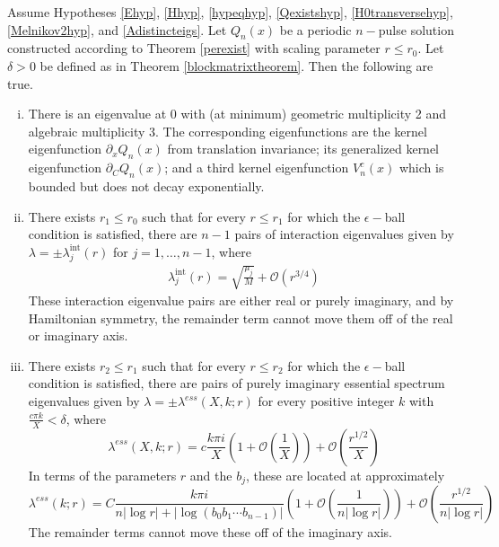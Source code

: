 \documentclass[thesis.tex]{subfiles}
\begin{document}
\begin{theorem}\label{locateeigtheorem}
Assume Hypotheses \ref{Ehyp}, \ref{Hhyp}, \ref{hypeqhyp}, \ref{Qexistshyp}, \ref{H0transversehyp}, \ref{Melnikov2hyp}, and \ref{Adistincteigs}. Let $Q_n(x)$ be a periodic $n-$pulse solution constructed according to Theorem \ref{perexist} with scaling parameter $r \leq r_0$. Let $\delta > 0$ be defined as in Theorem \ref{blockmatrixtheorem}. Then the following are true.

\begin{enumerate}[(i)]

\item There is an eigenvalue at 0 with (at minimum) geometric multiplicity 2 and algebraic multiplicity 3. The corresponding eigenfunctions are the kernel eigenfunction $\partial_x Q_n(x)$ from translation invariance; its generalized kernel eigenfunction $\partial_C Q_n(x)$; and a third kernel eigenfunction $V_n^c(x)$ which is bounded but does not decay exponentially.

\item There exists $r_1 \leq r_0$ such that for every $r \leq r_1$ for which the $\epsilon-$ball condition is satisfied, there are $n - 1$ pairs of interaction eigenvalues given by $\lambda = \pm \lambda^{\text{int}}_j(r)$ for $j = 1, \dots, n-1$, where
\begin{align*}
\lambda^{\text{int}}_j(r) = \sqrt{\frac{\mu_j}{M}} + \mathcal{O}(r^{3/4})
\end{align*}
These interaction eigenvalue pairs are either real or purely imaginary, and by Hamiltonian symmetry, the remainder term cannot move them off of the real or imaginary axis.

\item There exists $r_2 \leq r_1$ such that for every $r \leq r_2$ for which the $\epsilon-$ball condition is satisfied, there are pairs of purely imaginary essential spectrum eigenvalues given by $\lambda = \pm \lambda^{ess}(X,k; r)$ for every positive integer $k$ with $\frac{c \pi k}{X} < \delta$, where
\begin{equation}\label{lambdaess}
\lambda^{ess}(X, k; r) = c \frac{k \pi i }{X} \left( 1 + \mathcal{O}\left( \frac{1}{X} \right)\right) + \mathcal{O}\left( \frac{r^{1/2}}{X} \right)
\end{equation}
In terms of the parameters $r$ and the $b_j$, these are located at approximately
\begin{equation}\label{lambdaessr}
\lambda^{ess}(k; r) = C \frac{k \pi i }{n |\log r| + |\log (b_0 b_1 \cdots b_{n-1})|}  \left( 1 + \mathcal{O}\left( \frac{1}{n |\log r|} \right)\right) + \mathcal{O}\left( \frac{r^{1/2}}{n |\log r|} \right)
\end{equation}
The remainder terms cannot move these off of the imaginary axis.


\end{enumerate}
\end{theorem}
\end{document}
